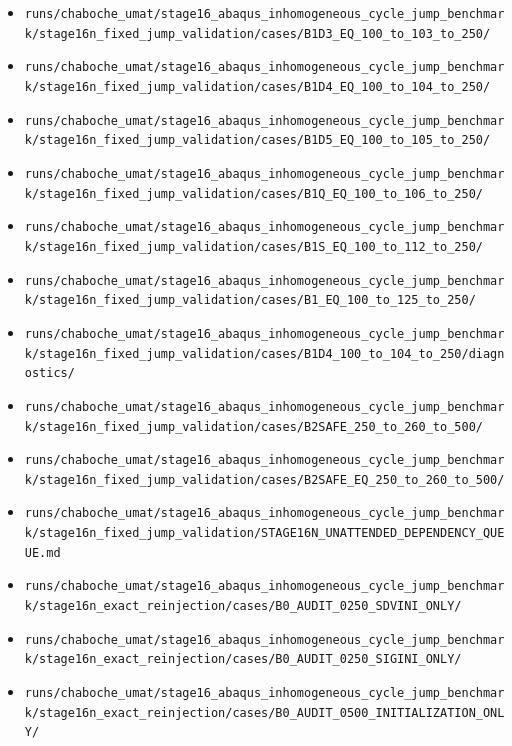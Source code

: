 \documentclass[11pt,a4paper]{article}
\newcommand{\code}[1]{\texttt{#1}}
\begin{document}
\begin{itemize}
  \item \code{runs/chaboche\_umat/stage16\_abaqus\_inhomogeneous\_cycle\_jump\_benchmark/stage16n\_fixed\_jump\_validation/cases/B1D3\_EQ\_100\_to\_103\_to\_250/}
  \item \code{runs/chaboche\_umat/stage16\_abaqus\_inhomogeneous\_cycle\_jump\_benchmark/stage16n\_fixed\_jump\_validation/cases/B1D4\_EQ\_100\_to\_104\_to\_250/}
  \item \code{runs/chaboche\_umat/stage16\_abaqus\_inhomogeneous\_cycle\_jump\_benchmark/stage16n\_fixed\_jump\_validation/cases/B1D5\_EQ\_100\_to\_105\_to\_250/}
  \item \code{runs/chaboche\_umat/stage16\_abaqus\_inhomogeneous\_cycle\_jump\_benchmark/stage16n\_fixed\_jump\_validation/cases/B1Q\_EQ\_100\_to\_106\_to\_250/}
  \item \code{runs/chaboche\_umat/stage16\_abaqus\_inhomogeneous\_cycle\_jump\_benchmark/stage16n\_fixed\_jump\_validation/cases/B1S\_EQ\_100\_to\_112\_to\_250/}
  \item \code{runs/chaboche\_umat/stage16\_abaqus\_inhomogeneous\_cycle\_jump\_benchmark/stage16n\_fixed\_jump\_validation/cases/B1\_EQ\_100\_to\_125\_to\_250/}
  \item \code{runs/chaboche\_umat/stage16\_abaqus\_inhomogeneous\_cycle\_jump\_benchmark/stage16n\_fixed\_jump\_validation/cases/B1D4\_100\_to\_104\_to\_250/diagnostics/}
  \item \code{runs/chaboche\_umat/stage16\_abaqus\_inhomogeneous\_cycle\_jump\_benchmark/stage16n\_fixed\_jump\_validation/cases/B2SAFE\_250\_to\_260\_to\_500/}
  \item \code{runs/chaboche\_umat/stage16\_abaqus\_inhomogeneous\_cycle\_jump\_benchmark/stage16n\_fixed\_jump\_validation/cases/B2SAFE\_EQ\_250\_to\_260\_to\_500/}
  \item \code{runs/chaboche\_umat/stage16\_abaqus\_inhomogeneous\_cycle\_jump\_benchmark/stage16n\_fixed\_jump\_validation/STAGE16N\_UNATTENDED\_DEPENDENCY\_QUEUE.md}
  \item \code{runs/chaboche\_umat/stage16\_abaqus\_inhomogeneous\_cycle\_jump\_benchmark/stage16n\_exact\_reinjection/cases/B0\_AUDIT\_0250\_SDVINI\_ONLY/}
  \item \code{runs/chaboche\_umat/stage16\_abaqus\_inhomogeneous\_cycle\_jump\_benchmark/stage16n\_exact\_reinjection/cases/B0\_AUDIT\_0250\_SIGINI\_ONLY/}
  \item \code{runs/chaboche\_umat/stage16\_abaqus\_inhomogeneous\_cycle\_jump\_benchmark/stage16n\_exact\_reinjection/cases/B0\_AUDIT\_0500\_INITIALIZATION\_ONLY/}

\end{itemize}
\end{document}
